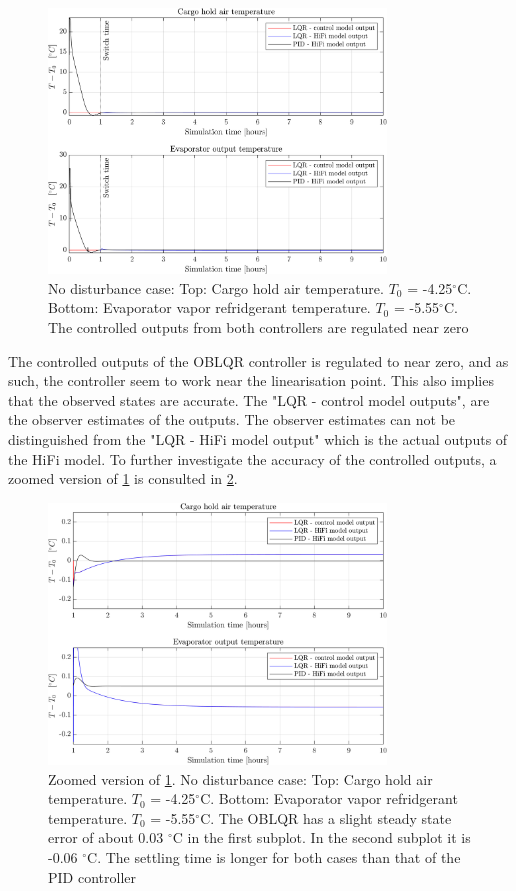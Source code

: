 \begin{figure}[H]
	\centering
	\includegraphics[width=0.8\textwidth]{Graphics/fig_LQRvsKresten_noDist.png}
	\caption{No disturbance case: Top: Cargo hold air temperature. $T_0$ = -4.25$^{\circ}$C. Bottom: Evaporator vapor refridgerant temperature. $T_0$ = -5.55$^{\circ}$C. The controlled outputs from both controllers are regulated near zero}
	\label{fig:LQR_wellTuned_noDist}
\end{figure} 
The controlled outputs of the OBLQR controller is regulated to near zero, and as such, the controller seem to work near the linearisation point. This also implies that the observed states are accurate. The "LQR - control model outputs", are the observer estimates of the outputs. The observer estimates can not be distinguished from the "LQR - HiFi model output" which is the actual outputs of the HiFi model. To further investigate the accuracy of the controlled outputs, a zoomed version of \cref{fig:LQR_wellTuned_noDist} is consulted in \cref{fig:LQR_wellTuned_noDist_zoom}.


\begin{figure}[H]
	\centering
	\includegraphics[width=0.8\textwidth]{Graphics/fig_LQRvsKresten_noDist_zoom.png}
	\caption{Zoomed version of \cref{fig:LQR_wellTuned_noDist}. No disturbance case: Top: Cargo hold air temperature. $T_0$ = -4.25$^{\circ}$C. Bottom: Evaporator vapor refridgerant temperature. $T_0$ = -5.55$^{\circ}$C. The OBLQR has a slight steady state error of about 0.03 $^{\circ}$C in the first subplot. In the second subplot it is -0.06 $^{\circ}$C. The settling time is longer for both cases than that of the PID controller}
	\label{fig:LQR_wellTuned_noDist_zoom}
\end{figure}

